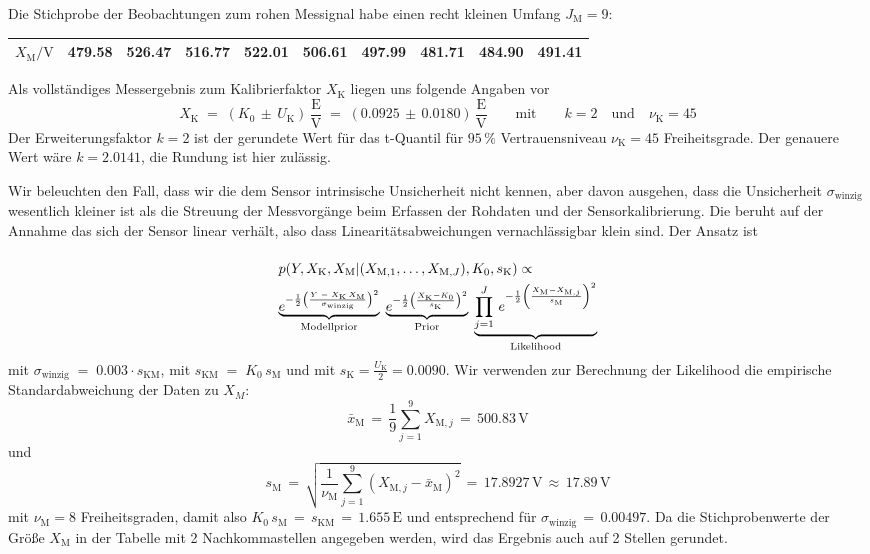 Die Stichprobe der Beobachtungen zum rohen Messignal habe einen recht kleinen
Umfang $J_\mathrm{M} = 9$:

\begin{tabular}{l|c|c|c|c|c|c|c|c|c}
\hline
$X_\mathrm{M} / \mathrm{V}$ &  479.58 &  526.47 &  516.77 &  522.01 &  506.61 &  497.99 &  481.71 &  484.90 &  491.41\\
\hline
\end{tabular}

Als vollständiges Messergebnis zum Kalibrierfaktor $X_\mathrm{K}$ liegen uns folgende Angaben vor
$$
X_\mathrm{K} \; = \; (K_0 \, \pm \, U_\mathrm{K}) \, \frac{\mathrm{E}}{\mathrm{V}}
 \; = \; (0.0925 \, \pm \, 0.0180) \, \frac{\mathrm{E}}{\mathrm{V}}
 \qquad \mathrm{mit} \qquad k = 2 \quad \mathrm{und} \quad \nu_\mathrm{K} = 45
$$
Der Erweiterungsfaktor $k = 2$ ist der gerundete Wert für das
t-Quantil für $95 \, \%$ Vertrauensniveau $\nu_\mathrm{K} = 45$ Freiheitsgrade.
Der genauere Wert wäre $k = 2.0141$, die Rundung ist hier zulässig.

Wir beleuchten den Fall, dass wir die dem Sensor intrinsische Unsicherheit nicht kennen, aber
davon ausgehen, dass die Unsicherheit $\sigma_\mathrm{winzig}$
wesentlich kleiner ist als die Streuung der Messvorgänge beim
Erfassen der Rohdaten und der Sensorkalibrierung. Die beruht auf der Annahme
das sich der Sensor linear verhält, also dass Linearitätsabweichungen vernachlässigbar
klein sind. Der Ansatz ist
\begin{equation}
\arraycolsep=2.0pt\def\arraystretch{2.0}
\begin{array}{l}
p(Y, X_\mathrm{K}, X_\mathrm{M} | (X_{\mathrm{M},1}, \dots, X_{\mathrm{M},J}), K_0, s_\mathrm{K}) \propto \\
\underbrace{e^{-\frac{1}{2} \left(\frac{ Y \; - \; X_\mathrm{K} \, X_\mathrm{M}}{\sigma_\mathrm{winzig}} \right)^2}}_{\text{Modellprior}}
\;  \underbrace{e^{-\frac{1}{2} \left(\frac{X_\mathrm{K} - K_0}{s_\mathrm{K}} \right)^2}}_{\text{Prior}}
 \; \underbrace{\prod\limits_{j=1}^J  \,
e^{-\frac{1}{2} \left(\frac{ X_\mathrm{M} - X_{\mathrm{M},j} }{s_\mathrm{M}} \right)^2}}_{\text{Likelihood}}
\end{array}
\label{PosteriorSensor}
\end{equation}
mit $\sigma_\mathrm{winzig} \; = \; 0.003 \cdot s_\mathrm{KM}$, mit $s_\mathrm{KM}  \; = \; K_0 \,
s_\mathrm{M}$ und mit $s_\mathrm{K} = \frac{U_\mathrm{K}}{2} = 0.0090$.
Wir verwenden zur Berechnung der Likelihood die empirische Standardabweichung der Daten zu $X_M$:
$$
\bar x_\mathrm{M} \, = \, \frac{1}{9} \sum_{j=1}^9 X_{\mathrm{M},j} \, = \, 500.83 \, \mathrm{V}
$$
und
$$
s_\mathrm{M} \, = \, \sqrt{ \frac{1}{\nu_\mathrm{M}} \sum_{j=1}^9 (X_{\mathrm{M},j} - \bar x_\mathrm{M})^2 }
 \, = \, 17.8927 \, \mathrm{V} \, \approx \,  17.89 \, \mathrm{V}
$$
mit $\nu_\mathrm{M} = 8$ Freiheitsgraden,
damit also
$K_0 \, s_\mathrm{M} \, = \, s_\mathrm{KM} \, = \, 1.655 \, \mathrm{E}$ und entsprechend für $\sigma_\mathrm{winzig} \, = \, 0.00497$.
Da die Stichprobenwerte
der Größe $X_\mathrm{M}$ in der Tabelle mit 2 Nachkommastellen angegeben werden, wird das Ergebnis
auch auf 2 Stellen gerundet.


